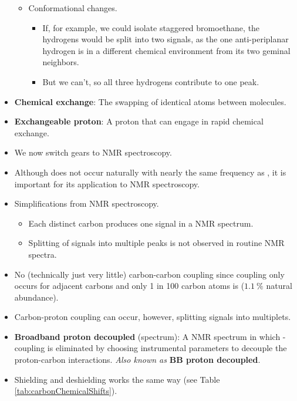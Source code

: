 \documentclass[../notes.tex]{subfiles}
\begin{document}
\begin{itemize}
\begin{itemize}
\begin{itemize}
        \end{itemize}
        \item Conformational changes.
        \begin{itemize}
            \item If, for example, we could isolate staggered bromoethane, the  hydrogens would be split into two signals, as the one anti-periplanar hydrogen is in a different chemical environment from its two geminal neighbors.
            \item But we can't, so all three  hydrogens contribute to one peak.
        \end{itemize}
    \end{itemize}
    \item \textbf{Chemical exchange}: The swapping of identical atoms between molecules.
    \item \textbf{Exchangeable proton}: A proton that can engage in rapid chemical exchange.
    \item We now switch gears to  NMR spectroscopy.
    \item Although  does not occur naturally with nearly the same frequency as , it is important for its application to NMR spectroscopy.
    \item Simplifications from  NMR spectroscopy.
    \begin{itemize}
        \item Each distinct carbon produces one signal in a  NMR spectrum.
        \item Splitting of  signals into multiple peaks is not observed in routine  NMR spectra.
    \end{itemize}
    \item No (technically just very little) carbon-carbon coupling since coupling only occurs for adjacent carbons and only 1 in 100 carbon atoms is  ($\SI{1.1}{\percent}$ natural abundance).
    \item Carbon-proton coupling can occur, however, splitting  signals into multiplets.
    \item \textbf{Broadband proton decoupled} (spectrum): A  NMR spectrum in which - coupling is eliminated by choosing instrumental parameters to decouple the proton-carbon interactions. \emph{Also known as} \textbf{BB proton decoupled}.
    \item Shielding and deshielding works the same way (see Table \ref{tab:carbonChemicalShifts}).

\end{itemize}
\end{document}
